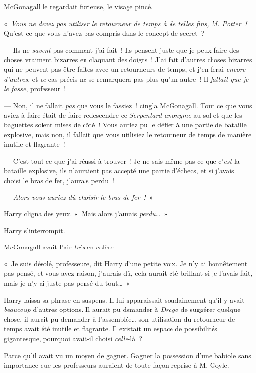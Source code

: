 McGonagall le regardait furieuse, le visage pincé.

«~\emph{Vous ne devez pas utiliser le retourneur de temps à de telles fins, M. Potter~!}
Qu'est-ce que vous n'avez pas compris dans le concept de secret~?

--- Ils ne \emph{savent} pas comment j'ai fait~!
Ils pensent juste que je peux faire des choses vraiment bizarres en claquant des doigts~!
J'ai fait d'autres choses bizarres qui ne peuvent pas être faites avec un retourneurs de temps, et j'en ferai \emph{encore d'autres}, et \emph{ce} cas précis ne se remarquera pas plus qu'un autre~!
Il \emph{fallait que je le fasse}, professeur~!

--- Non, il ne fallait \emph{pas} que vous le fassiez~! cingla McGonagall.
Tout ce que vous aviez à faire était de faire redescendre ce \emph{Serpentard anonyme} au sol et que les baguettes soient mises de côté~!
Vous auriez pu le défier à une partie de bataille explosive, mais non, il fallait que vous utilisiez le retourneur de temps de manière inutile et flagrante~!

--- C'est tout ce que j'ai réussi à trouver~!
Je ne sais même pas ce que c'\emph{est} la bataille explosive, ils n'auraient pas accepté une partie d'échecs, et si j'avais choisi le bras de fer, j'aurais perdu~!

--- \emph{Alors vous auriez dû choisir le bras de fer~!}~»

Harry cligna des yeux. «~Mais alors j'aurais \emph{perdu}…~»

Harry s'interrompit.

McGonagall avait l'air \emph{très} en colère.

«~Je suis désolé, professeure, dit Harry d'une petite voix.
Je n'y ai honnêtement pas pensé, et vous avez raison, j'aurais dû, cela aurait été brillant si je l'avais fait, mais je n'y ai juste pas pensé du tout…~»

Harry laissa sa phrase en suspens.
Il lui apparaissait soudainement qu'il y avait \emph{beaucoup} d'autres options.
Il aurait pu demander à \emph{Drago} de suggérer quelque chose, il aurait pu demander à l'assemblée… son utilisation du retourneur de temps avait été inutile et flagrante.
Il existait un espace de possibilités gigantesque, pourquoi avait-il choisi \emph{celle}-là~?

Parce qu'il avait vu un moyen de gagner.
Gagner la possession d'une babiole sans importance que les professeurs auraient de toute façon reprise à M. Goyle.

